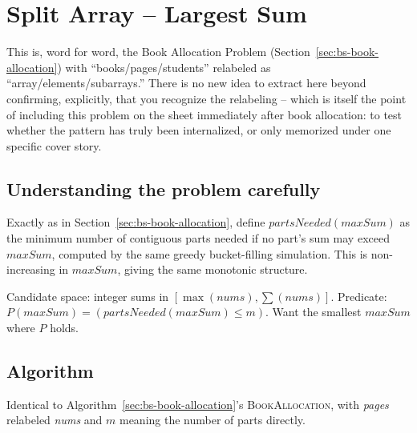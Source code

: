 \section{Split Array -- Largest Sum}
\label{sec:bs-split-array}


\begin{patternbox}
This is, word for word, the Book Allocation Problem
(Section~\ref{sec:bs-book-allocation}) with ``books/pages/students''
relabeled as ``array/elements/subarrays.'' There is no new idea to extract
here beyond confirming, explicitly, that you recognize the relabeling --
which is itself the point of including this problem on the sheet
immediately after book allocation: to test whether the pattern has truly
been internalized, or only memorized under one specific cover story.
\end{patternbox}

\subsection*{Understanding the problem carefully}

Exactly as in Section~\ref{sec:bs-book-allocation}, define
$\textit{partsNeeded}(\textit{maxSum})$ as the minimum number of
contiguous parts needed if no part's sum may exceed $\textit{maxSum}$,
computed by the same greedy bucket-filling simulation. This is
non-increasing in $\textit{maxSum}$, giving the same monotonic structure.

\begin{ideabox}
Candidate space: integer sums in $[\max(\textit{nums}),
\sum(\textit{nums})]$. Predicate:
$P(\textit{maxSum}) = (\textit{partsNeeded}(\textit{maxSum}) \le m)$. Want
the smallest $\textit{maxSum}$ where $P$ holds.
\end{ideabox}

\subsection*{Algorithm}

Identical to Algorithm~\ref{sec:bs-book-allocation}'s
\textsc{BookAllocation}, with \textit{pages} relabeled \textit{nums} and
$m$ meaning the number of parts directly.

